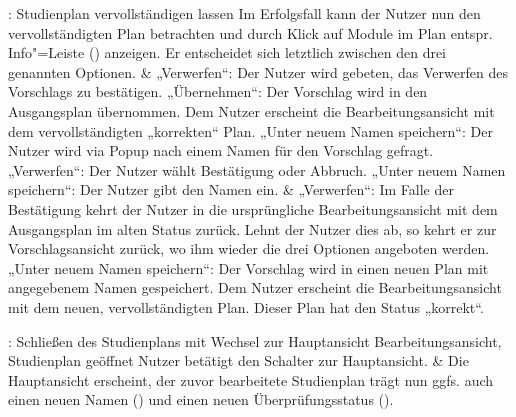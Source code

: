 \begin{usecase}{: Studienplan vervollständigen lassen}
	\hline
	Im Erfolgsfall kann der Nutzer nun den vervollständigten Plan betrachten und durch Klick auf Module im Plan entspr. Info"=Leiste () anzeigen.
	Er entscheidet sich letztlich zwischen den drei genannten Optionen. 
	& „Verwerfen“: Der Nutzer wird gebeten, das Verwerfen des Vorschlags zu bestätigen. \newline
	„Übernehmen“: Der Vorschlag wird in den Ausgangsplan übernommen. Dem Nutzer erscheint die Bearbeitungsansicht mit dem vervollständigten „korrekten“ Plan. \newline
	„Unter neuem Namen speichern“:  Der Nutzer wird via Popup nach einem Namen für den Vorschlag gefragt. \\
	\hline
	„Verwerfen“: Der Nutzer wählt Bestätigung oder Abbruch. \newline
	„Unter neuem Namen speichern“: Der Nutzer gibt den Namen ein. 
	& „Verwerfen“: Im Falle der Bestätigung kehrt der Nutzer in die ursprüngliche Bearbeitungsansicht mit dem Ausgangsplan im alten Status zurück. Lehnt der Nutzer dies ab, so kehrt er zur Vorschlagsansicht zurück, wo ihm wieder die drei Optionen angeboten werden. \newline
	„Unter neuem Namen speichern“: Der Vorschlag wird in einen neuen Plan mit angegebenem Namen gespeichert. Dem Nutzer erscheint die Bearbeitungsansicht mit dem neuen, vervollständigten Plan. Dieser Plan hat den Status „korrekt“.
\end{usecase}

\begin{usecase}{: Schließen des Studienplans mit Wechsel zur Hauptansicht}
	{Bearbeitungsansicht, Studienplan geöffnet}
	Nutzer betätigt den Schalter zur Hauptansicht.
	& Die Hauptansicht erscheint, der zuvor bearbeitete Studienplan trägt nun ggfs. auch einen neuen Namen () und einen neuen Überprüfungsstatus ().
\end{usecase}


\bigskip

\renewcommand{\arraystretch}{1.0}
\setlength{\LTpre}{\bigskipamount}
\setlength{\LTpost}{\bigskipamount}